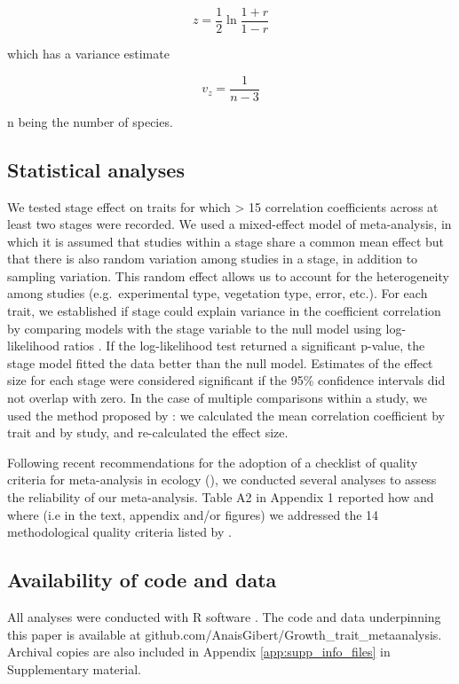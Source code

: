\documentclass[a4paper]{article}\usepackage[]{graphicx}\usepackage[]{color}
\begin{document}
\[ z = \frac{1}{2} \ln \frac{1+r}{1-r} \]

which has a variance estimate

\[ v_z= \frac{1}{n-3} \]

n being the number of species.

\subsection*{Statistical analyses}\label{statistical-analyses}

We tested stage effect on traits for which > 15 correlation coefficients across at least two stages were recorded. We used a mixed-effect model of meta-analysis, in which it is assumed that studies within a stage share a common mean effect but that there is also random variation among studies in a stage, in addition to sampling variation. This random effect allows us to account for the heterogeneity among studies (e.g.~experimental type, vegetation type, error, etc.). For each trait, we established if stage could explain variance in the coefficient correlation by comparing models with the stage variable to the null model using log-likelihood ratios \citep{Zuur:2009cfa}. If the log-likelihood test returned a significant p-value, the stage model fitted the data better than the null model. Estimates of the effect size for each stage were considered significant if the 95\% confidence intervals did not overlap with zero. In the case of multiple comparisons within a study, we used the method proposed by \citet{Borenstein:2009um}: we calculated the mean correlation coefficient by trait and by study, and re-calculated the effect size. 

Following recent recommendations for the adoption of a checklist of quality criteria for meta-analysis in ecology (\citealt{Koricheva:2014ku}), we conducted several analyses to assess the reliability of our meta-analysis. Table A2 in Appendix 1 reported how and where (i.e in the text, appendix and/or figures) we addressed the 14 methodological quality criteria listed by \citet{Koricheva:2014ku}. 


\subsection*{Availability of code and data}\label{code}

All analyses were conducted with R software \citep{Ralanguageanden:2014wf}. The code and data underpinning this paper is available at github.com/AnaisGibert/Growth\_trait\_metaanalysis. Archival copies are also included in Appendix \ref{app:supp_info_files} in Supplementary material.
\end{document}
